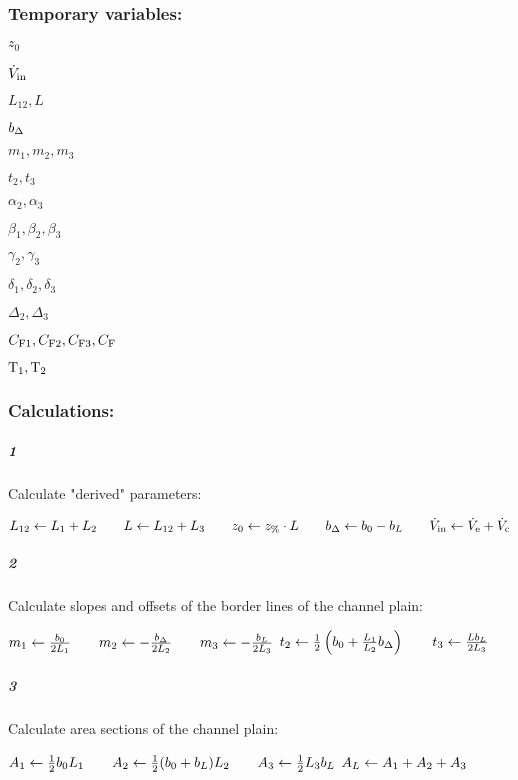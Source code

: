 \subsubsection*{Temporary variables:}
\begin{multicols}{3}
  \begin{packed_item}
    \item $z_0$
    \item $\dot{V}_\text{in}$
    \item $L_{12}, L$  
    \item $b_\Delta$
    \item $m_1, m_2, m_3$
    \item $t_2, t_3$
    \item $α_2, α_3$
    \item $β_1, β_2, β_3$
    \item $γ_2, γ_3$
    \item $δ_1, δ_2, δ_3$
    \item $Δ_2, Δ_3$
    \item $C_\text{F1}, C_\text{F2}, C_\text{F3}, C_\text{F}$
    \item $\text{T}_{1}, \text{T}_{2}$
  \end{packed_item}
\end{multicols}
\subsubsection*{Calculations:}
\subparagraph{1}
Calculate "derived" parameters:
\begin{algorithmic}
  \State $L_{12} \leftarrow L_1 + L_2
  \qquad L \leftarrow L_{12} + L_3
  \qquad z_0 \leftarrow z_\text{\%} \cdot L
  \qquad b_\Delta \leftarrow  b_0 - b_L
  \qquad \dot{V}_\text{in} \leftarrow \dot{V}_\text{e} + \dot{V}_\text{c}
  $
\end{algorithmic}
\subparagraph{2}
Calculate slopes and offsets of the border lines of the channel plain:
\begin{algorithmic}
  \State $       m_1 \leftarrow   \frac{b_0}{2L_1}
  \qquad m_2 \leftarrow - \frac{b_\Delta}{2L_2}
  \qquad m_3 \leftarrow - \frac{b_L}{2L_3}
  $\vspace*{.5ex}
  \State $           t_2 \leftarrow \frac{1}{2} \left( b_0 +  \frac{L_1}{L_2}b_\Delta \right)
  \qquad t_3 \leftarrow \frac{L b_L}{2 L_3 }
  $\vspace*{.5ex}
\end{algorithmic}
\subparagraph{3}
Calculate area sections of the channel plain:
\begin{algorithmic}
  \State $       A_1 \leftarrow \frac{1}{2} b_0  L_1  
  \qquad A_2 \leftarrow  \frac{1}{2} (b_0 + b_L) L_2  
  \qquad A_3 \leftarrow \frac{1}{2} L_3b_L  
  $\vspace*{.5ex}
  \State $  A_L \leftarrow A_1 + A_2 + A_3
  $\vspace*{.5ex}
\end{algorithmic}

